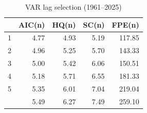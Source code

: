 \begin{table}

\caption{\label{tab:tbl-var-select}VAR lag selection (1961--2025)}
\centering
\begin{tabular}[t]{lrrrr}
\toprule
  & AIC(n) & HQ(n) & SC(n) & FPE(n)\\
\midrule
1 & 4.77 & 4.93 & 5.19 & 117.85\\
2 & 4.96 & 5.25 & 5.70 & 143.33\\
3 & 5.00 & 5.42 & 6.06 & 150.51\\
4 & 5.18 & 5.71 & 6.55 & 181.33\\
5 & 5.35 & 6.01 & 7.04 & 219.04\\
\addlinespace
6 & 5.49 & 6.27 & 7.49 & 259.10\\
\bottomrule
\end{tabular}
\end{table}
